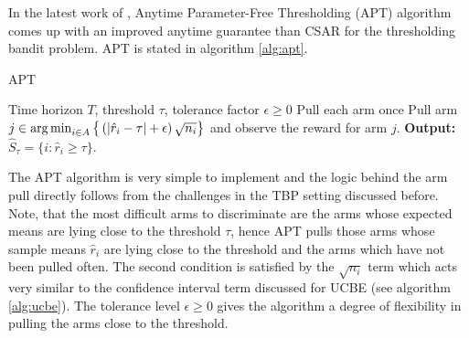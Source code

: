 In the latest work of \citet{locatelli2016optimal}, Anytime Parameter-Free Thresholding (APT) algorithm comes up with an improved anytime guarantee than CSAR for the thresholding bandit problem. APT is stated in algorithm \ref{alg:apt}. 

\begin{algorithm}[!th]
\caption{APT}
\label{alg:apt}
\begin{algorithmic}
 Time horizon $T$, threshold $\tau$, tolerance factor $\epsilon\geq 0$
\State Pull each arm once
\State {}
\State Pull arm $j\in\operatorname*{arg\,min}_{i\in A}\big\lbrace \left(|\hat{r}_{i} - \tau | + \epsilon\right)\sqrt{n_i}\big\rbrace$ and observe the reward for arm $j$.
\EndFor
\State \textbf{Output:} $\hat{S}_{\tau}=\lbrace i: \hat{r}_{i}\geq \tau \rbrace$.
\end{algorithmic}
\end{algorithm}

The APT algorithm is very simple to implement and the logic behind the arm pull directly follows from the challenges in the TBP setting discussed before. Note, that the most difficult arms to discriminate are the arms whose expected means are lying close to the threshold $\tau$, hence APT pulls those arms whose sample means $\hat{r}_i$ are lying close to the threshold and the arms which have not been pulled often. The second condition is satisfied by the $\sqrt{n_i}$ term which acts very similar to the confidence interval term discussed for UCBE (see algorithm \ref{alg:ucbe}). The tolerance level $\epsilon\geq 0$ gives the algorithm a degree of flexibility in pulling the arms close to the threshold.